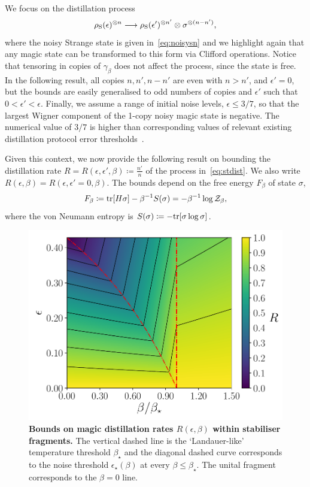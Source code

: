\documentclass[pra,
aps,
twocolumn,
superscriptaddress,
groupedaddress,
nofootinbib,
reprint
]{revtex4-1}
\begin{document}
We focus on the distillation process
\begin{equation}\label{eq:stdist}
	\rho_{\rm{S}}(\epsilon)^{\otimes n} \longrightarrow \rho_{\rm{S}}(\epsilon')^{\otimes n'} \otimes \sigma^{\otimes (n-n')},
\end{equation}
where the noisy Strange state is given in~\cref{eq:noisysn} and we highlight again that any magic state can be transformed to this form via Clifford operations.
Notice that tensoring in copies of $\gamma_\beta$ does not affect the process, since the state is free.
In the following result, all copies $n, n', n - n'$ are even with $n > n'$, and $\epsilon'=0$, but the bounds are easily generalised to odd numbers of copies and $\epsilon'$ such that $0 < \epsilon' < \epsilon$. 
Finally, we assume a range of initial noise levels, $\epsilon \leq 3/7$, so that the largest Wigner component of the 1-copy noisy magic state is negative.
The numerical value of $3/7$ is higher than corresponding values of relevant existing distillation protocol error thresholds~\cite{cit:bravyi,cit:prakash}.

Given this context, we now provide the following result on bounding the distillation rate $R = R(\epsilon, \epsilon', \beta) \coloneqq \frac{n'}{n}$ of the process in~\cref{eq:stdist}.
We also write $R(\epsilon, \beta) = R(\epsilon, \epsilon'=0, \beta)$.
The bounds depend on the free energy $F_\beta$ of state $\sigma$,
\begin{equation}
	F_\beta \coloneqq {\rm{tr}}[H \sigma] - \beta^{-1}S(\sigma) = -\beta^{-1}\log{\mathcal{Z}_\beta},
\end{equation}
where the von Neumann entropy is $S(\sigma) \coloneqq -{\rm{tr}}[\sigma\log{\sigma}]$.

\begin{figure}[t!]
    \centering
    \includegraphics[scale=0.55]{figs/rate_scatter.pdf}
    \caption{\textbf{Bounds on magic distillation rates $R(\epsilon, \beta)$ within stabiliser fragments.}
    The vertical dashed line is the `Landauer-like' temperature threshold $\beta_\star$ and the diagonal dashed curve corresponds to the noise threshold $\epsilon_\star (\beta)$ at every $\beta \leq \beta_\star$. The unital fragment corresponds to the $\beta =0 $ line.
    }
    \label{fig:rate_contour}
\end{figure}
\end{document}

